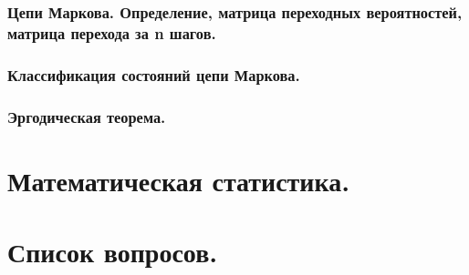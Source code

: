 \documentclass[14pt]{extarticle}
\theoremstyle{breakstyle}
\begin{document}
\subsubsection{Цепи Маркова. Определение, матрица переходных вероятностей, матрица перехода за n шагов.}

\subsubsection{Классификация состояний цепи Маркова.}

\subsubsection{Эргодическая теорема.}



\clearpage
\section{Математическая статистика.}



\clearpage
\section{Список вопросов.}
\end{document}
